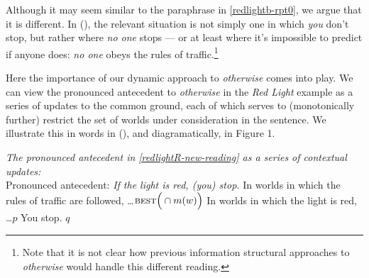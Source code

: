 \noindent Although it may seem similar to the paraphrase in \ref{redlightb-rpt0}, we argue that it is different. In (\lastx), the relevant situation is not simply one in which \textit{you} don't stop, but rather where \textit{no one} stops --- or at least where it's impossible to predict if anyone does: \textit{no one} obeys the rules of traffic.\footnote{Note that it is not clear how previous information structural approaches to \textit{otherwise} would handle this different reading.} 

Here the importance of our dynamic approach to \textit{otherwise} comes into play. We can view the pronounced antecedent to \textit{otherwise} in the \textit{Red Light} example as a series of updates to the common ground, each of which serves to (monotonically further) restrict the set of worlds under consideration in the sentence. We illustrate this in words in (\nextx), and diagramatically, in Figure 1.


\pex  \textit{The pronounced antecedent in \ref{redlightR-new-reading} as a series of contextual updates:}\\
Pronounced antecedent: \textit{If the light is red, (you) stop.}
\a  In worlds in which the rules of traffic are followed, \ldots \hfill {\scriptsize $\textsc{best}\Big(\cap m(w)\Big)$}
\a  In worlds in which the light is red, \ldots \hfill {\small $p$}
\a  You stop. \hfill {\small $q$}\xe


